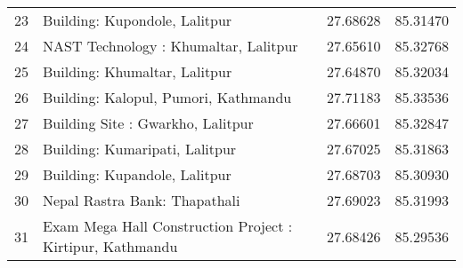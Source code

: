 \begin{tabularx}{\textwidth}{ | l | p{} | X | X | }
 23 & Building: Kupondole, Lalitpur & 27.68628 & 85.31470 \\
 24 & NAST Technology : Khumaltar, Lalitpur & 27.65610 & 85.32768 \\
 25 & Building: Khumaltar, Lalitpur  & 27.64870 & 85.32034 \\
 26 & Building: Kalopul, Pumori, Kathmandu & 27.71183 & 85.33536 \\
 27 & Building Site : Gwarkho, Lalitpur & 27.66601 & 85.32847 \\
 28 & Building: Kumaripati, Lalitpur & 27.67025 & 85.31863 \\
 29 & Building: Kupandole, Lalitpur & 27.68703 & 85.30930 \\
 30 & Nepal Rastra Bank: Thapathali & 27.69023 & 85.31993 \\
 31 & Exam Mega Hall Construction Project : Kirtipur, Kathmandu & 27.68426 & 85.29536 \\
\hline
\end{tabularx}
